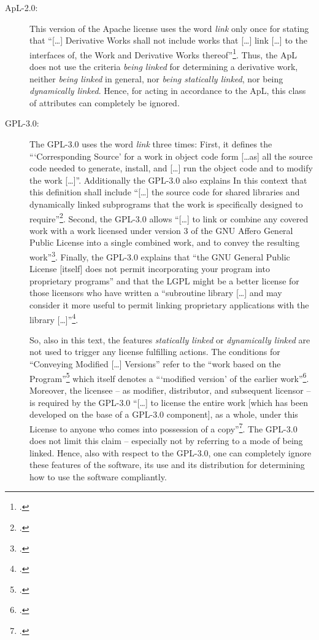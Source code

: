 \begin{description}

  \item[ApL-2.0:] This version of the Apache license uses the word \emph{link}
  only once for stating that \enquote{[\ldots] Derivative Works shall not
  include works that [\ldots] link [\ldots] to the interfaces of, the Work and
  Derivative Works thereof}\footcite [cf.][\nopage wp.\
  §0]{Apl20OsiLicense2004a}. Thus, the ApL does not use the criteria \emph{being
  linked} for determining a derivative work, neither \emph{being linked} in
  general, nor \emph{being statically linked}, nor being \emph{dynamically
  linked}. Hence, for acting in accordance to the ApL, this class of attributes
  can completely be ignored.

  \item[GPL-3.0:] The GPL-3.0 uses the word \emph{link} three times: First, it
  defines the \enquote{\enquote{Corresponding Source} for a work in object code
  form [\ldots as] all the source code needed to generate, install, and [\ldots]
  run the object code and to modify the work [\ldots]}. Additionally the GPL-3.0
  also explains In this context that this definition shall include
  \enquote{[\ldots] the source code for shared libraries and dynamically linked
  subprograms that the work is specifically designed to
  require}\footcite[cf.][\nopage wp.\ §0]{Gpl30OsiLicense2007a}. Second, the
  GPL-3.0 allows \enquote{[\ldots] to link or combine any covered work with a
  work licensed under version 3 of the GNU Affero General Public License into a
  single combined work, and to convey the resulting work}\footcite[cf.][\nopage
  wp.\ §13]{Gpl30OsiLicense2007a}. Finally, the GPL-3.0 explains that
  \enquote{the GNU General Public License [itself] does not permit incorporating
  your program into proprietary programs} and that the LGPL might be a better
  license for those licensors who have written a \enquote{subroutine library
  [\ldots] and may consider it more useful to permit linking proprietary
  applications with the library [\ldots]}\footcite[cf.][\nopage wp.\ last
  parapgraph]{Gpl30OsiLicense2007a}.
  
  So, also in this text, the features \emph{statically linked} or
  \emph{dynamically linked} are not used to trigger any license fulfilling
  actions. The conditions for \enquote{Conveying Modified [\ldots] Versions}
  refer to the \enquote{work based on the Program}\footcite[cf.][\nopage wp.\
  §5]{Gpl30OsiLicense2007a} which itself denotes a \enquote{\enquote{modified
  version} of the earlier work}\footcite[cf.][\nopage wp.\
  §0]{Gpl30OsiLicense2007a}. Moreover, the licensee -- as modifier, distributor,
  and subsequent licensor -- is required by the GPL-3.0 \enquote{[\ldots] to
  license the entire work [which has been developed on the base of a GPL-3.0
  component], as a whole, under this License to anyone who comes into possession
  of a copy}\footcite[cf.][\nopage wp.\ §5]{Gpl30OsiLicense2007a}. The GPL-3.0
  does not limit this claim -- especially not by referring to a mode of being
  linked. Hence, also with respect to the GPL-3.0, one can completely ignore
  these features of the software, its use and its distribution for determining
  how to use the software compliantly.


\end{description}
